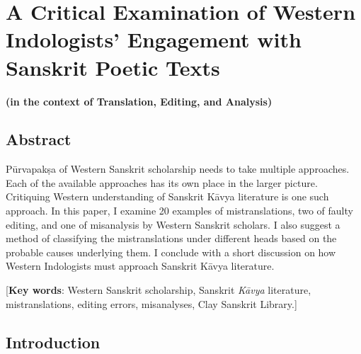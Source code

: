 \chapter[A Critical Examination of Western Indologists’...]{A Critical Examination of Western Indologists’ Engagement with Sanskrit Poetic Texts}\label{chapter\thechapter:begin}

\begin{center}
{\bf (in the context of Translation, Editing, and Analysis)}
\end{center}


\section*{Abstract} 

Pūrvapakṣa of Western Sanskrit scholarship needs to take multiple approaches. Each of the available approaches has its own place in the larger picture. Critiquing Western understanding of Sanskrit Kāvya literature is one such approach. In this paper, I examine 20 examples of mistranslations, two of faulty editing, and one of misanalysis by Western Sanskrit scholars. I also suggest a method of classifying the mistranslations under different heads based on the probable causes underlying them. I conclude with a short discussion on how Western Indologists must approach Sanskrit Kāvya literature. 

\medskip
\noindent
{[{\bf Key words}: 
Western Sanskrit scholarship, Sanskrit \textsl{Kāvya} literature, mistranslations, editing errors, misanalyses, Clay Sanskrit Library.]} 

\section*{Introduction}  

